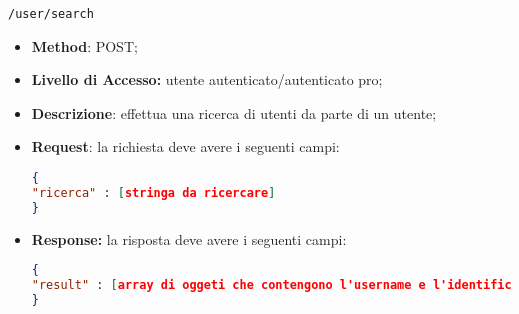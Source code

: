	\item \texttt{/user/search}
	 \begin{itemize}
	 	\item \textbf{Method}: POST;
	 	\item \textbf{Livello di Accesso:} utente autenticato/autenticato pro;
	 	\item \textbf{Descrizione}: effettua una ricerca di utenti da parte di un utente;
	 	\item \textbf{Request}: la richiesta deve avere i seguenti campi:
\begin{lstlisting}[language=json,firstnumber=1]
{
"ricerca" : [stringa da ricercare]
}
\end{lstlisting} 
		\item \textbf{Response:} la risposta deve avere i seguenti campi:
\begin{lstlisting}[language=json,firstnumber=1]
{
"result" : [array di oggeti che contengono l'username e l'identificativo degli utenti trovati]
}
\end{lstlisting}
	 \end{itemize}